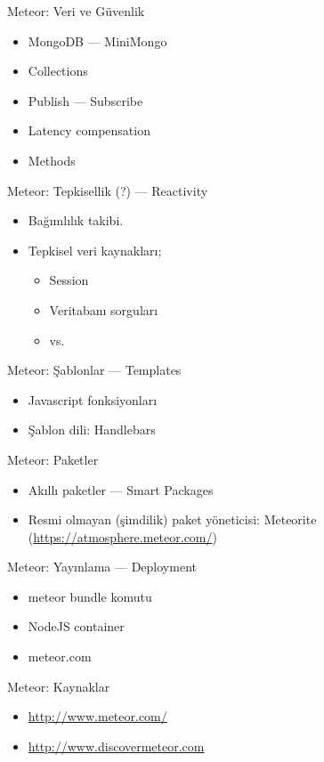 \documentclass{beamer}
\begin{document}
    \begin{frame}{Meteor: Veri ve Güvenlik}
        \begin{itemize}
            \item MongoDB --- MiniMongo
            \item Collections
            \item Publish --- Subscribe
            \item Latency compensation
            \item Methods
        \end{itemize}
    \end{frame}

    \begin{frame}{Meteor: Tepkisellik (?) --- Reactivity}
        \begin{itemize}
            \item Bağımlılık takibi.
            \item Tepkisel veri kaynakları;
                \begin{itemize}
                    \item Session
                    \item Veritabanı sorguları
                    \item vs.
                \end{itemize}
        \end{itemize}
    \end{frame}

    \begin{frame}{Meteor: Şablonlar --- Templates}
        \begin{itemize}
            \item Javascript fonksiyonları
            \item Şablon dili: Handlebars
        \end{itemize}
    \end{frame}

    \begin{frame}{Meteor: Paketler}
        \begin{itemize}
            \item Akıllı paketler --- Smart Packages
            \item Resmi olmayan (şimdilik) paket yöneticisi: Meteorite (\url{https://atmosphere.meteor.com/})
        \end{itemize}
    \end{frame}

    \begin{frame}{Meteor: Yay{\i}nlama --- Deployment}
        \begin{itemize}
            \item meteor bundle komutu
            \item NodeJS container
            \item meteor.com
        \end{itemize}
    \end{frame}

    \begin{frame}{Meteor: Kaynaklar}
        \begin{itemize}
            \item \url{http://www.meteor.com/}
            \item \url{http://www.discovermeteor.com}
        \end{itemize}
    \end{frame}
\end{document}
